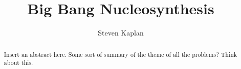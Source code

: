 \documentclass[aps,reprint,prl]{revtex4-1}
\begin{document}
\title{Big Bang Nucleosynthesis}
\author{Steven Kaplan}

\begin{abstract}
Insert an abstract here. Some sort of summary of the theme of all the problems? Think about this.
\end{abstract}

\maketitle
\end{document}
